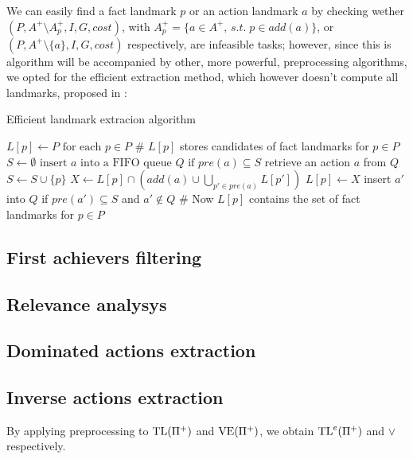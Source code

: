 We can easily find a fact landmark $p$ or an action landmark $a$ by checking wether $(P,A^+\setminus A^+_p,I,G,cost)$, with $A^+_p=\{a\in A^+,\,s.t.\;p\in add(a)\}$, or $(P,A^+\setminus \{a\},I,G,cost)$ respectively, are infeasible tasks; however, since this is algorithm will be accompanied by other, more powerful, preprocessing algorithms, we opted for the efficient extraction method, which however doesn't compute all landmarks, proposed in \cite{Imai_15}:
\begin{algorithm}[h]
    \caption{Efficient landmark extracion algorithm}
    \begin{algorithmic}
        \State $L[p]\gets P\mbox{ for each } p\in P$ \qquad \# $L[p]$ stores candidates of fact landmarks for $p\in P$
        \State $S\gets\emptyset$
            \State $\mbox{insert }a\mbox{ into a FIFO queue }Q\mbox{ if }pre(a)\subseteq S$
        \EndFor
            \State retrieve an action $a$ from $Q$
                \State $S\gets S\cup\{p\}$
                \State $X\gets L[p]\cap(add(a)\cup\bigcup_{p'\in pre(a)}L[p'])$
                    \State $L[p]\gets X$
                    \State insert $a'$ into $Q$ if $pre(a')\subseteq S$ and $a'\not\in Q$
                    \EndFor
                \EndIf
            \EndFor
        \EndWhile
        \State \# Now $L[p]$ contains the set of fact landmarks for $p\in P$
    \end{algorithmic}
\end{algorithm}

\subsection{First achievers filtering}

\subsection{Relevance analysys}

\subsection{Dominated actions extraction}

\subsection{Inverse actions extraction}

By applying preprocessing to $\mbox{TL}(\Pi^+)$ and $\mbox{VE}(\Pi^+)$, we obtain $\mbox{TL}^e(\Pi^+)$ and $\vee$ respectively.